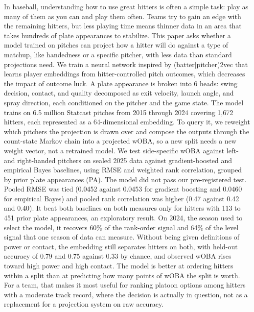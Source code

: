 In baseball, understanding how to use great hitters is often a simple task: play as many of them as you can and play them often. Teams try to gain an edge with the remaining hitters, but less playing time means thinner data in an area that takes hundreds of plate appearances to stabilize. This paper asks whether a model trained on pitches can project how a hitter will do against a type of matchup, like handedness or a specific pitcher, with less data than standard projections need. We train a neural network inspired by (batter$|$pitcher)2vec that learns player embeddings from hitter-controlled pitch outcomes, which decreases the impact of outcome luck. A plate appearance is broken into 6 heads: swing decision, contact, and quality decomposed as exit velocity, launch angle, and spray direction, each conditioned on the pitcher and the game state. The model trains on 6.5 million Statcast pitches from 2015 through 2024 covering 1,672 hitters, each represented as a 64-dimensional embedding. To query it, we reweight which pitchers the projection is drawn over and compose the outputs through the count-state Markov chain into a projected wOBA, so a new split needs a new weight vector, not a retrained model. We test side-specific wOBA against left- and right-handed pitchers on sealed 2025 data against gradient-boosted and empirical Bayes baselines, using RMSE and weighted rank correlation, grouped by prior plate appearances (PA). The model did not pass our pre-registered test. Pooled RMSE was tied (0.0452 against 0.0453 for gradient boosting and 0.0460 for empirical Bayes) and pooled rank correlation was higher (0.47 against 0.42 and 0.40). It beat both baselines on both measures only for hitters with 113 to 451 prior plate appearances, an exploratory result. On 2024, the season used to select the model, it recovers 60\% of the rank-order signal and 64\% of the level signal that one season of data can measure. Without being given definitions of power or contact, the embedding still separates hitters on both, with held-out accuracy of 0.79 and 0.75 against 0.33 by chance, and observed wOBA rises toward high power and high contact. The model is better at ordering hitters within a split than at predicting how many points of wOBA the split is worth. For a team, that makes it most useful for ranking platoon options among hitters with a moderate track record, where the decision is actually in question, not as a replacement for a projection system on raw accuracy.


